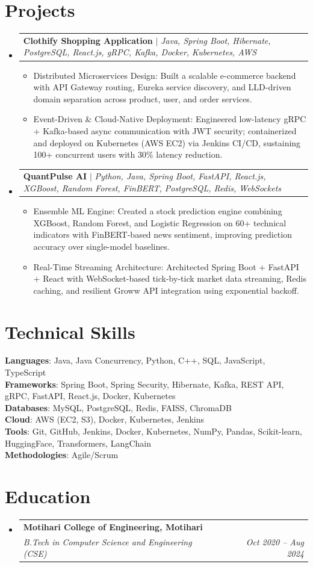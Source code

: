 \documentclass[10pt, letterpaper]{article}
\makeatletter
\newcommand{\resumeItem}[1]{
  \item\small{
    {#1 \vspace{-2pt}}
  }
}
\newcommand{\resumeSubheading}[4]{
  \vspace{-2pt}\item
    \begin{tabular*}{1.0\textwidth}[t]{l@{\extracolsep{\fill}}r}
      \textbf{#1} & \textbf{\small #2} \\
      \textit{\small#3} & \textit{\small #4} \\
    \end{tabular*}\vspace{-7pt}
}
\newcommand{\resumeProjectHeading}[2]{
    \item
    \begin{tabular*}{1.0\textwidth}{l@{\extracolsep{\fill}}r}
      \small#1 & \textbf{\small #2} \\
    \end{tabular*}\vspace{-7pt}
}
\newcommand{\resumeSubHeadingListStart}{\begin{itemize}[leftmargin=0.0in, label={}]}
\newcommand{\resumeSubHeadingListEnd}{\end{itemize}}
\newcommand{\resumeItemListStart}{\begin{itemize}[leftmargin=0.15in]}
\newcommand{\resumeItemListEnd}{\end{itemize}\vspace{-5pt}}
\makeatother
\begin{document}
\section{Projects}
\resumeSubHeadingListStart
  \resumeProjectHeading{\textbf{Clothify Shopping Application} $|$ \emph{Java, Spring Boot, Hibernate, PostgreSQL, React.js, gRPC, Kafka, Docker, Kubernetes, AWS}}{}
    \resumeItemListStart
      \resumeItem{Distributed Microservices Design: Built a scalable e-commerce backend with API Gateway routing, Eureka service discovery, and LLD-driven domain separation across product, user, and order services.}
      \resumeItem{Event-Driven \& Cloud-Native Deployment: Engineered low-latency gRPC + Kafka-based async communication with JWT security; containerized and deployed on Kubernetes (AWS EC2) via Jenkins CI/CD, sustaining 100+ concurrent users with 30\% latency reduction.}
    \resumeItemListEnd
  \resumeProjectHeading{\textbf{QuantPulse AI} $|$ \emph{Python, Java, Spring Boot, FastAPI, React.js, XGBoost, Random Forest, FinBERT, PostgreSQL, Redis, WebSockets}}{}
    \resumeItemListStart
      \resumeItem{Ensemble ML Engine: Created a stock prediction engine combining XGBoost, Random Forest, and Logistic Regression on 60+ technical indicators with FinBERT-based news sentiment, improving prediction accuracy over single-model baselines.}
      \resumeItem{Real-Time Streaming Architecture: Architected Spring Boot + FastAPI + React with WebSocket-based tick-by-tick market data streaming, Redis caching, and resilient Groww API integration using exponential backoff.}
    \resumeItemListEnd
\resumeSubHeadingListEnd


\section{Technical Skills}
\begin{itemize}[leftmargin=0.15in, label={}]
  \small{\item{
    \textbf{Languages}{: Java, Java Concurrency, Python, C++, SQL, JavaScript, TypeScript} \\
    \textbf{Frameworks}{: Spring Boot, Spring Security, Hibernate, Kafka, REST API, gRPC, FastAPI, React.js, Docker, Kubernetes} \\
    \textbf{Databases}{: MySQL, PostgreSQL, Redis, FAISS, ChromaDB} \\
    \textbf{Cloud}{: AWS (EC2, S3), Docker, Kubernetes, Jenkins} \\
    \textbf{Tools}{: Git, GitHub, Jenkins, Docker, Kubernetes, NumPy, Pandas, Scikit-learn, HuggingFace, Transformers, LangChain} \\
    \textbf{Methodologies}{: Agile/Scrum} \\
  }}
\end{itemize}


\section{Education}
\resumeSubHeadingListStart
  \resumeSubheading{Motihari College of Engineering, Motihari}{}{B.Tech in Computer Science and Engineering (CSE)}{Oct 2020 -- Aug 2024}
\resumeSubHeadingListEnd
\end{document}
